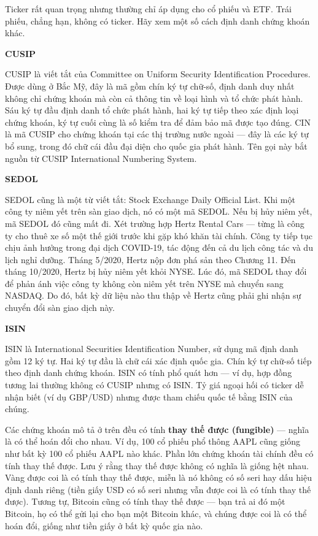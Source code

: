 Ticker rất quan trọng nhưng thường chỉ áp dụng cho cổ phiếu và ETF. Trái phiếu, chẳng hạn, không có ticker. Hãy xem một số cách định danh chứng khoán khác.

\textbf{CUSIP}

CUSIP là viết tắt của Committee on Uniform Security Identification Procedures. Được dùng ở Bắc Mỹ, đây là mã gồm chín ký tự chữ-số, định danh duy nhất không chỉ chứng khoán mà còn cả thông tin về loại hình và tổ chức phát hành. Sáu ký tự đầu định danh tổ chức phát hành, hai ký tự tiếp theo xác định loại chứng khoán, ký tự cuối cùng là số kiểm tra để đảm bảo mã được tạo đúng. CIN là mã CUSIP cho chứng khoán tại các thị trường nước ngoài — đây là các ký tự bổ sung, trong đó chữ cái đầu đại diện cho quốc gia phát hành. Tên gọi này bắt nguồn từ CUSIP International Numbering System.

\textbf{SEDOL}

SEDOL cũng là một từ viết tắt: Stock Exchange Daily Official List. Khi một công ty niêm yết trên sàn giao dịch, nó có một mã SEDOL. Nếu bị hủy niêm yết, mã SEDOL đó cũng mất đi. Xét trường hợp Hertz Rental Cars — từng là công ty cho thuê xe số một thế giới trước khi gặp khó khăn tài chính. Công ty tiếp tục chịu ảnh hưởng trong đại dịch COVID-19, tác động đến cả du lịch công tác và du lịch nghỉ dưỡng. Tháng 5/2020, Hertz nộp đơn phá sản theo Chương 11. Đến tháng 10/2020, Hertz bị hủy niêm yết khỏi NYSE. Lúc đó, mã SEDOL thay đổi để phản ánh việc công ty không còn niêm yết trên NYSE mà chuyển sang NASDAQ. Do đó, bất kỳ dữ liệu nào thu thập về Hertz cũng phải ghi nhận sự chuyển đổi sàn giao dịch này.

\textbf{ISIN}

ISIN là International Securities Identification Number, sử dụng mã định danh gồm 12 ký tự. Hai ký tự đầu là chữ cái xác định quốc gia. Chín ký tự chữ-số tiếp theo định danh chứng khoán. ISIN có tính phổ quát hơn — ví dụ, hợp đồng tương lai thường không có CUSIP nhưng có ISIN. Tỷ giá ngoại hối có ticker dễ nhận biết (ví dụ GBP/USD) nhưng được tham chiếu quốc tế bằng ISIN của chúng.

Các chứng khoán mô tả ở trên đều có tính \textbf{thay thế được (fungible)} — nghĩa là có thể hoán đổi cho nhau. Ví dụ, 100 cổ phiếu phổ thông AAPL cũng giống như bất kỳ 100 cổ phiếu AAPL nào khác. Phần lớn chứng khoán tài chính đều có tính thay thế được. Lưu ý rằng thay thế được không có nghĩa là giống hệt nhau. Vàng được coi là có tính thay thế được, miễn là nó không có số seri hay dấu hiệu định danh riêng (tiền giấy USD có số seri nhưng vẫn được coi là có tính thay thế được). Tương tự, Bitcoin cũng có tính thay thế được — bạn trả ai đó một Bitcoin, họ có thể gửi lại cho bạn một Bitcoin khác, và chúng được coi là có thể hoán đổi, giống như tiền giấy ở bất kỳ quốc gia nào.

